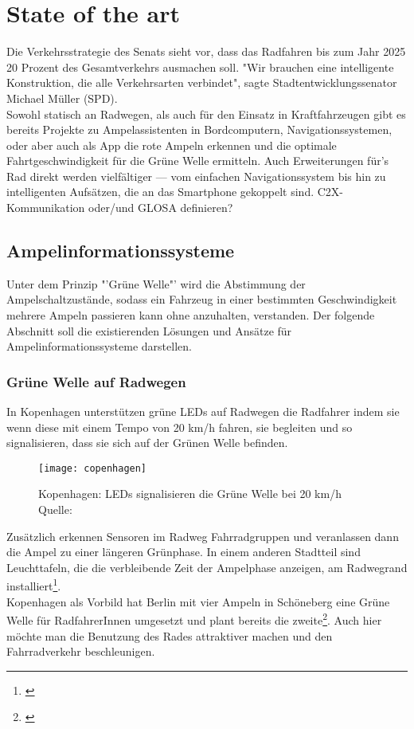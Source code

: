 \chapter{State of the art}
Die Verkehrsstrategie des Senats sieht vor, dass das Radfahren bis zum Jahr 2025 20 Prozent des Gesamtverkehrs ausmachen soll. \cite{Mopo}
"Wir brauchen eine intelligente Konstruktion, die alle Verkehrsarten verbindet", sagte Stadtentwicklungssenator Michael Müller (SPD).\\
Sowohl statisch an Radwegen, als auch für den Einsatz in Kraftfahrzeugen gibt es bereits Projekte zu Ampelassistenten in Bordcomputern, Navigationssystemen, oder aber auch als \gls{App} die rote Ampeln erkennen und die optimale Fahrtgeschwindigkeit für die Grüne Welle ermitteln. Auch Erweiterungen für's Rad direkt werden vielfältiger --- vom einfachen Navigationssystem bis hin zu intelligenten Aufsätzen, die an das Smartphone gekoppelt sind.
\gls{C2X}- Kommunikation oder/und \gls{GLOSA} definieren?
\section{Ampelinformationssysteme}
Unter dem Prinzip "'Grüne Welle"' wird die Abstimmung der Ampelschaltzustände, sodass ein Fahrzeug in einer bestimmten Geschwindigkeit mehrere Ampeln passieren kann ohne anzuhalten, verstanden. Der folgende Abschnitt soll die existierenden Lösungen und Ansätze für Ampelinformationssysteme darstellen.
\subsection{Grüne Welle auf Radwegen}
In Kopenhagen unterstützen grüne \gls{LED}s auf Radwegen die Radfahrer indem sie wenn diese mit einem Tempo von 20 km/h fahren, sie begleiten und so signalisieren, dass sie sich auf der Grünen Welle befinden. 
\begin{figure}[H]  
    \centering  
    \texttt{[image: copenhagen]} \label{fig:copenhagen}
    \caption[Grüne Welle durch \gls{LED}s]{Kopenhagen: \gls{LED}s signalisieren die Grüne Welle bei 20 km/h  Quelle: \cite{NYT}}
\end{figure}
Zusätzlich erkennen Sensoren im Radweg Fahrradgruppen und veranlassen dann die Ampel zu einer längeren Grünphase. In einem anderen Stadtteil sind Leuchttafeln, die die verbleibende Zeit der Ampelphase anzeigen, am Radwegrand installiert\footnote{\cite{KopIng}}.\\
Kopenhagen als Vorbild hat Berlin mit vier Ampeln in Schöneberg eine Grüne Welle für RadfahrerInnen umgesetzt und plant bereits die zweite\footnote{\cite{BZ}}. Auch hier möchte man die Benutzung des Rades attraktiver machen und den Fahrradverkehr beschleunigen.
